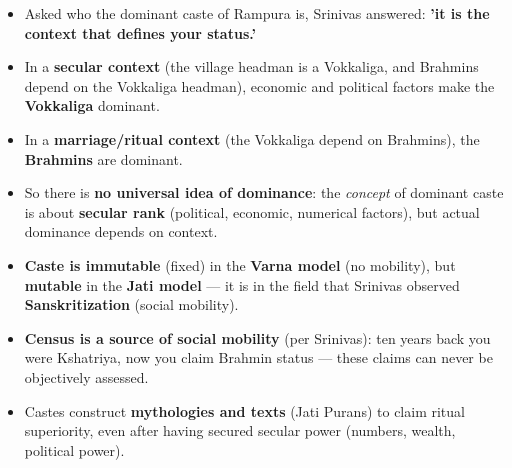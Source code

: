 \begin{KeyConcept}
\begin{itemize}
\item Asked who the dominant caste of Rampura is, Srinivas answered: \textbf{'it is the context that defines your status.'}
\item In a \textbf{secular context} (the village headman is a Vokkaliga, and Brahmins depend on the Vokkaliga headman), economic and political factors make the \textbf{Vokkaliga} dominant.
\item In a \textbf{marriage/ritual context} (the Vokkaliga depend on Brahmins), the \textbf{Brahmins} are dominant.
\item So there is \textbf{no universal idea of dominance}: the \emph{concept} of dominant caste is about \textbf{secular rank} (political, economic, numerical factors), but actual dominance depends on context.
\end{itemize}
\end{KeyConcept}

\begin{KeyConcept}
\begin{itemize}
\item \textbf{Caste is immutable} (fixed) in the \textbf{Varna model} (no mobility), but \textbf{mutable} in the \textbf{Jati model} --- it is in the field that Srinivas observed \textbf{Sanskritization} (social mobility).
\item \textbf{Census is a source of social mobility} (per Srinivas): ten years back you were Kshatriya, now you claim Brahmin status --- these claims can never be objectively assessed.
\item Castes construct \textbf{mythologies and texts} (Jati Purans) to claim ritual superiority, even after having secured secular power (numbers, wealth, political power).
\end{itemize}
\end{KeyConcept}

